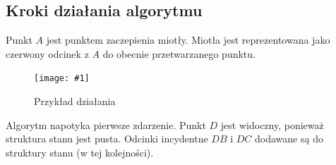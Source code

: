 \documentclass[12pt]{article}
\newcommand{\imgcustomsize}[3]{
	\begin{figure}[H]
		\centering
		\texttt{[image: \#1]}
		\caption{#2}
		\label{#1}
	\end{figure}
}
\newcommand{\img}[2]{\imgcustomsize{#1}{#2}{0.5}}
\begin{document}
			\vspace{\baselineskip} %
			\vspace{\baselineskip} %
			\vspace{\baselineskip} %
			
			
				
			
				
				
			
		
		\subsection{Kroki działania algorytmu} \label{sssec:steps}
			Punkt $ A $ jest punktem zaczepienia miotły. Miotła jest reprezentowana jako czerwony odcinek z $ A $ do obecnie przetwarzanego punktu.
			
			\imgcustomsize{visibility-step000-001.jpg}{Przykład działania}{0.35}
			Algorytm napotyka pierwsze zdarzenie.  Punkt $ D $ jest widoczny, ponieważ struktura stanu jest pusta. Odcinki incydentne $ DB $ i $ DC $ dodawane są do struktury stanu (w tej kolejności).
			
\end{document}
